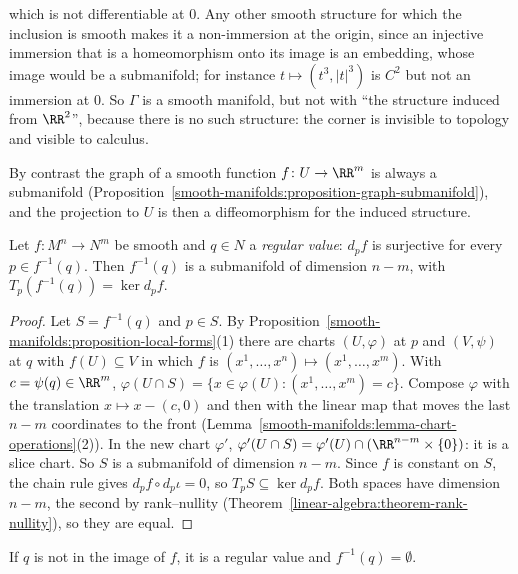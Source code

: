 \begin{example}
\begin{enumerate}
which is not differentiable at $0$. Any other smooth structure for which the inclusion is smooth makes it a non-immersion at the origin, since an injective immersion that is a homeomorphism onto its
image is an embedding, whose image would be a submanifold; for instance $t \mapsto (t^3, |t|^3)$ is $C^2$ but not an immersion at $0$. So $\Gamma$ is a smooth manifold, but not with ``the structure
induced from $\RR^2$'', because there is no such structure: the corner is invisible to topology and visible to calculus.
\end{enumerate}
By contrast the graph of a smooth function $f \colon U \to \RR^m$ is always a submanifold (Proposition~\ref{smooth-manifolds:proposition-graph-submanifold}), and the projection to $U$ is then a diffeomorphism
for the induced structure.
\end{example}

\begin{theorem}\label{smooth-manifolds:theorem-regular-value}
Let $f \colon M^n \to N^m$ be smooth and $q \in N$ a \emph{regular value}: $d_pf$ is surjective for every $p \in f^{-1}(q)$. Then $f^{-1}(q)$ is a submanifold of dimension $n - m$, with
$T_p(f^{-1}(q)) = \ker d_pf$.
\end{theorem}

\begin{proof}
Let $S = f^{-1}(q)$ and $p \in S$. By Proposition~\ref{smooth-manifolds:proposition-local-forms}(1) there are charts $(U, \varphi)$ at $p$ and $(V, \psi)$ at $q$
with $f(U) \subseteq V$ in which $f$ is $(x^1, \ldots, x^n) \mapsto (x^1, \ldots, x^m)$. With $c = \psi(q) \in \RR^m$,
$\varphi(U \cap S) = \{x \in \varphi(U) : (x^1, \ldots, x^m) = c\}$. Compose $\varphi$ with the translation $x \mapsto x - (c, 0)$ and then with the linear map
that moves the last $n - m$ coordinates to the front (Lemma~\ref{smooth-manifolds:lemma-chart-operations}(2)). In the new chart $\varphi'$,
$\varphi'(U \cap S) = \varphi'(U) \cap (\RR^{n-m} \times \{0\})$: it is a slice chart. So $S$ is a submanifold of dimension $n - m$. Since $f$ is constant on $S$, the chain
rule gives $d_pf \circ d_p\iota = 0$, so $T_pS \subseteq \ker d_pf$. Both spaces have dimension $n - m$, the second by rank--nullity
(Theorem~\ref{linear-algebra:theorem-rank-nullity}), so they are equal.
\end{proof}

If $q$ is not in the image of $f$, it is a regular value and $f^{-1}(q) = \emptyset$.

